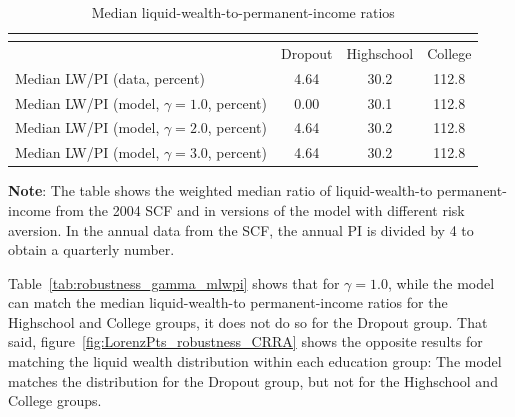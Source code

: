 \documentclass[\econtexRoot/EGMN]{subfiles}
\begin{document}
\begin{table}[th]
    \begin{center}
        \begin{tabular}{lccc}
            \multicolumn{4}{l}{}                                                           \\ \midrule
                                                          & Dropout & Highschool & College \\ \midrule
            Median LW/PI (data, percent)                  & 4.64    & 30.2       & 112.8   \\
            Median LW/PI (model, $\gamma = 1.0$, percent) & 0.00    & 30.1       & 112.8   \\
            Median LW/PI (model, $\gamma = 2.0$, percent) & 4.64    & 30.2       & 112.8   \\
            Median LW/PI (model, $\gamma = 3.0$, percent) & 4.64    & 30.2       & 112.8   \\ \bottomrule
        \end{tabular}
        \caption{Median liquid-wealth-to-permanent-income ratios}
        \notinsubfile{\label{tab:robustness_gamma_mlwpi}}
        \parbox{15cm}{\small \vspace{.05cm} \textbf{Note}: The table shows the weighted median ratio of liquid-wealth-to permanent-income from the 2004 SCF and in versions of the model with different risk aversion. In the annual data from the SCF, the annual PI is divided by 4 to obtain a quarterly number.\normalsize}
    \end{center}
\end{table}

Table~\ref{tab:robustness_gamma_mlwpi} shows that for $\gamma=1.0$, while the model can match the median liquid-wealth-to permanent-income ratios for the Highschool and College groups, it does not do so for the Dropout group. That said, figure~\ref{fig:LorenzPts_robustness_CRRA} shows the opposite results for matching the liquid wealth distribution within each education group: The model matches the distribution for the Dropout group, but not for the Highschool and College groups.
\end{document}
